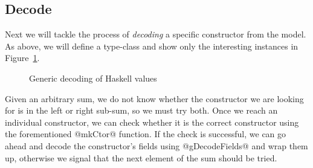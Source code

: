 


  

\subsection{Decode}\label{sec:generic-decode}
Next we will tackle the process of \emph{decoding} a specific constructor from
the model. As above, we will define a type-class and show only the interesting
instances in Figure~\ref{fig:generic-decode}.
%
\begin{figure}[ht]
\begin{mdframed}
\begin{CenteredBox}
\end{CenteredBox}
\end{mdframed}
\caption{Generic decoding of Haskell values}\label{fig:generic-decode}
\end{figure}

Given an arbitrary sum, we do not know whether the constructor we are looking
for is in the left or right sub-sum, so we must try both.
%
Once we reach an individual constructor, we can check whether it is the correct
constructor using the forementioned @mkCtor@ function. If the check is
successful, we can go ahead and decode the constructor's fields using
@gDecodeFields@ and wrap them up, otherwise we signal that the next element of
the sum should be tried.

